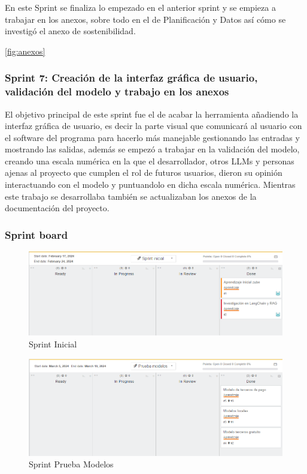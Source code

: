 En este Sprint se finaliza lo empezado en el anterior sprint y se empieza a trabajar en los anexos, sobre todo en el de Planificación y Datos así cómo se investigó el anexo de sostenibilidad.

\ref{fig:anexos}

\subsubsection{Sprint 7: Creación de la interfaz gráfica de usuario, validación del modelo y trabajo en los anexos}

El objetivo principal de este sprint fue el de acabar la herramienta añadiendo la interfaz gráfica de usuario, es decir la parte visual que comunicará al usuario con el software del programa para hacerlo más manejable gestionando las entradas y mostrando las salidas, además se empezó a trabajar en la validación del modelo, creando una escala numérica en la que el desarrollador, otros LLMs y personas ajenas al proyecto que cumplen el rol de futuros usuarios, dieron su opinión interactuando con el modelo y puntuandolo en dicha escala numérica. Mientras este trabajo se desarrollaba también se actualizaban los anexos de la documentación del proyecto.

\subsubsection{Sprint board}

\begin{figure}[h!]
    \centering
    \includegraphics[width=1\textwidth]{img/SprintInicial.png}
    \caption{Sprint Inicial}
    \label{fig:sprintinicial}
\end{figure}

\begin{figure}[h!]
    \centering
    \includegraphics[width=1\textwidth]{img/PruebaModelos.png}
    \caption{Sprint Prueba Modelos}
    \label{fig:pruebamodelos}
\end{figure}

